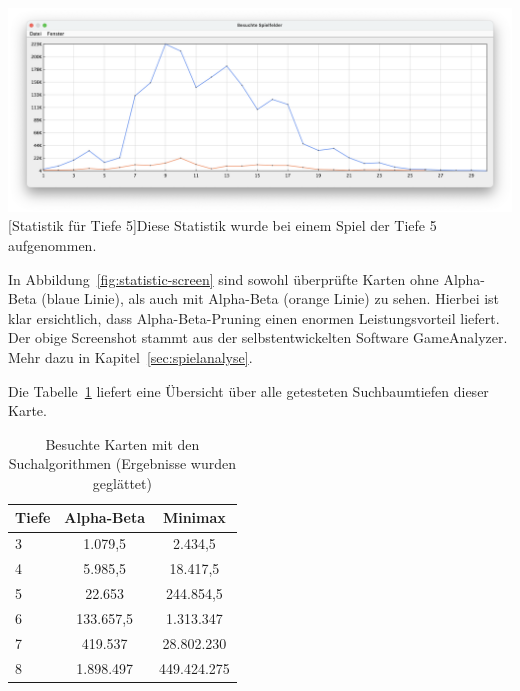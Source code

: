\vspace{1em}
\begin{minipage}{\linewidth}
    \centering
    \includegraphics[width=0.9\linewidth]{statistic/Test-D5-01/ST-01-D5-LD}
    [Statistik für Tiefe 5]{Diese Statistik wurde bei einem Spiel der Tiefe 5 aufgenommen.}
    \label{fig:statistic-screen}
\end{minipage}

In Abbildung~\ref{fig:statistic-screen} sind sowohl \"uberpr\"ufte Karten ohne Alpha-Beta (blaue Linie), als auch mit Alpha-Beta (orange Linie) zu sehen.
Hierbei ist klar ersichtlich, dass Alpha-Beta-Pruning einen enormen Leistungsvorteil liefert.
Der obige Screenshot stammt aus der selbstentwickelten Software GameAnalyzer.
Mehr dazu in Kapitel~\ref{sec:spielanalyse}.

Die Tabelle~\ref{tab:search-depth} liefert eine \"Ubersicht \"uber alle getesteten Suchbaumtiefen dieser Karte.

\vspace{1em}
\begin{table}[!h]
    \centering
    \begin{tabular}{|l|c|c|}
        \hline
        \textbf{Tiefe} & \textbf{Alpha-Beta} & \textbf{Minimax}\\
        \hline
        3 & 1.079,5 & 2.434,5\\
        \hline
        4 & 5.985,5 & 18.417,5\\
        \hline
        5 & 22.653 & 244.854,5\\
        \hline
        6 & 133.657,5 & 1.313.347\\
        \hline
        7 & 419.537 & 28.802.230\\
        \hline
        8 & 1.898.497 & 449.424.275\\
        \hline
    \end{tabular}
    \caption{Besuchte Karten mit den Suchalgorithmen (Ergebnisse wurden geglättet)}
    \label{tab:search-depth}
\end{table}

